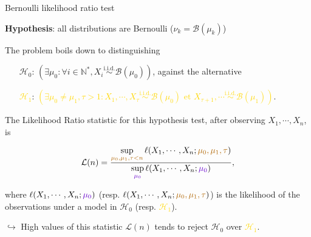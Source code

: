 \documentclass[11pt,french,ignorenonframetext,]{beamer}
\begin{document}
\begin{frame}{Bernoulli likelihood ratio test}

  \textbf{Hypothesis}: all distributions are Bernoulli ($\nu_k = \mathcal{B}(\mu_k)$)

  The problem boils down to distinguishing
  \begin{itemize}
    \item[\textcolor{deeppurple}{$\mathcal{H}_0$}:]
    \textcolor{deeppurple}{$(\exists \mu_0 : \forall i\in\mathbb{N}^*, X_i \overset{\text{i.i.d.}}{\sim} \mathcal{B}(\mu_0))$},
    against the alternative
    \item[\textcolor{gold}{$\mathcal{H}_1$}:]
    \textcolor{gold}{$(\exists \mu_0 \neq \mu_1, \tau > 1 : X_1, \cdots, X_\tau \overset{\text{i.i.d.}}{\sim} \mathcal{B}(\mu_0) \text{~et~} X_{\tau+1}, \cdots \overset{\text{i.i.d.}}{\sim} \mathcal{B}(\mu_1))$}.
  \end{itemize}

  \pause

  The \alert{Likelihood Ratio statistic} for this hypothesis test, after observing $X_1,\cdots,X_n$, is
  \begin{small}
    \[ \mathcal{L}(n) = \frac{\sup\limits_{\textcolor{gold}{\mu_0,\mu_1,\tau < n}}\ell(X_1,\cdots,X_n ; \textcolor{gold}{\mu_0,\mu_1,\tau})}{\sup\limits_{\textcolor{deeppurple}{\mu_0}}\ell(X_1,\cdots,X_n ;\textcolor{deeppurple}{\mu_0})},\]
  \end{small}

  where $\ell(X_1,\cdots,X_n ; \textcolor{deeppurple}{\mu_0})$ (resp. $\ell(X_1,\cdots,X_n ; \textcolor{gold}{\mu_0,\mu_1,\tau})$) is the likelihood of the observations under a model in \textcolor{deeppurple}{$\mathcal{H}_0$} (resp. \textcolor{gold}{$\mathcal{H}_1$}).

  \pause

  \alert{$\hookrightarrow$ High values of this statistic $\mathcal{L}(n)$ tends to reject \textcolor{deeppurple}{$\mathcal{H}_0$} over \textcolor{gold}{$\mathcal{H}_1$}.}

\end{frame}
\end{document}

